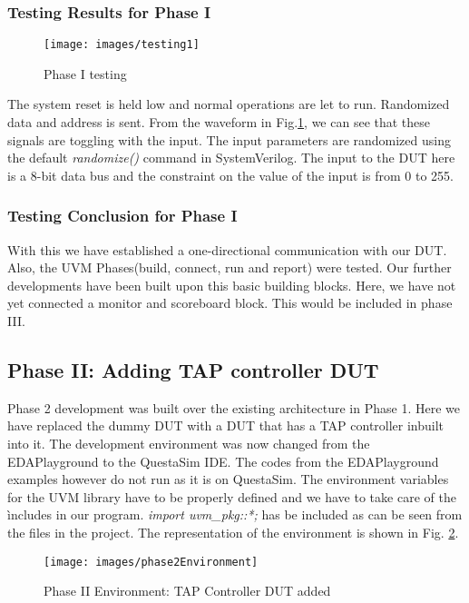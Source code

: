 \documentclass[a4paper,11pt]{article}
\begin{document}
\subsubsection{Testing Results for Phase I}

\begin{figure}[ht]
\centering
\texttt{[image: images/testing1]}
\caption{Phase I testing}
\label{fig: Phase I Testing}
\end{figure}

The system reset is held low and normal operations are let to run. Randomized data and address is sent. From the waveform in Fig.\ref{fig: Phase I Testing}, we can see that these signals are toggling with the input. The input parameters are randomized using the default \textit{randomize()} command in SystemVerilog. The input to the DUT here is a 8-bit data bus and the constraint on the value of the input is from 0 to 255. 

\subsubsection{Testing Conclusion for Phase I}
With this we have established a one-directional communication with our DUT. Also, the UVM Phases(build, connect, run and report) were tested. Our further developments have been built upon this basic building blocks. Here, we have not yet connected a monitor and scoreboard block. This would be included in phase III.
\ \\
\FloatBarrier
\subsection{Phase II: Adding TAP controller DUT}

Phase 2 development was built over the existing architecture in Phase 1. Here we have replaced the dummy DUT with a DUT that has a TAP controller inbuilt into it. The development environment was now changed from the EDAPlayground to the QuestaSim IDE. The codes from the EDAPlayground examples however do not run as it is on QuestaSim. The environment variables for the UVM library have to be properly defined and we have to take care of the \`includes in our program. \textit{import uvm\_pkg::*;} has be included as can be seen from the files in the project. The representation of the environment is shown in Fig. \ref{fig: Phase II Environment}.

\begin{figure}[ht]
\centering
\texttt{[image: images/phase2Environment]}
\caption{Phase II Environment: TAP Controller DUT added}
\label{fig: Phase II Environment}
\end{figure}
\FloatBarrier
\end{document}
